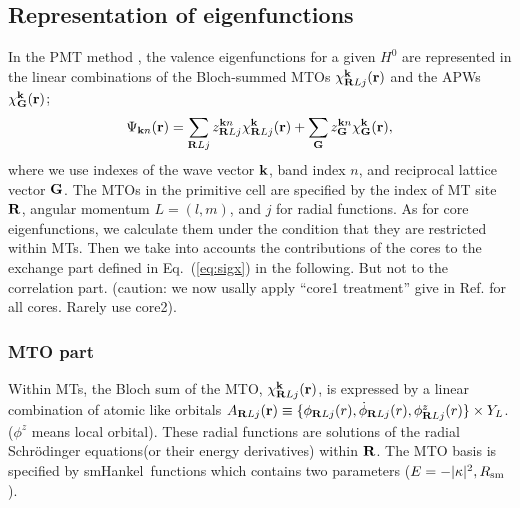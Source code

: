 \documentclass[a4paper,10pt,fleqn]{article}
\def\Psikn{\Psi_{{\bf k}n}}
\def\Psikn{{\Psi_{{\bf k}n}}}
\def\brl{{\bf R}L}
\def\smh{smHankel}
\def\H0{H^0}
\newcommand{\bfk}{{\bf k}}
\newcommand{\bfr}{{\bf r}}
\newcommand{\bfG}{{\bf G}}
\newcommand{\bfR}{{\bf R}}
\newcommand{\req}[1]{\mbox{Eq.~(\ref{#1})}}
\begin{document}
\subsection{Representation of eigenfunctions}
In the PMT method \cite{kotani_fusion_2010}, 
the valence eigenfunctions for a given $\H0$ are represented
in the linear combinations of the Bloch-summed MTOs
$\chi^{\bfk}_{\brl{j}}({\bf r})$ and the APWs $\chi^{\bfk}_\bfG (\bfr)$;
\begin{eqnarray}
\label{eq:lmtopsi}
\Psikn(\bfr) = \sum_{\brl{j}} z^{{\bfk}n}_{\brl{j}}
\chi^{\bfk}_{\brl{j}}({\bfr})+ \sum_{\bfG} z^{\bfk n}_{\bfG}
\chi^{\bfk}_\bfG(\bfr),
\label{eqeigen}
\end{eqnarray}
where we use indexes of the wave vector $\bfk$, band index $n$, and 
reciprocal lattice vector $\bfG$. The MTOs in the primitive cell are 
specified by the index of MT site $\bfR$, 
angular momentum $L=(l,m)$, and $j$ for radial functions. 
As for core eigenfunctions, we calculate them under the condition
that they are restricted within MTs.
Then we take into accounts the contributions of the cores to the exchange part defined in \req{eq:sigx} in the following. But not to the correlation part. 
{\small (caution: we now usally apply ``core1 treatment'' give in 
Ref.\cite{kotani07a} for all cores. Rarely use core2).}


\subsubsection{ MTO part}
Within MTs, the Bloch sum of the MTO, 
$\chi^{{\bf k}}_{\brl{j}}({\bf r})$, is 
expressed by a linear combination of atomic like orbitals 
$A_{\bfR{Lj}}({\bf r})
\equiv \{ 
\phi_{\bfR{Lj}}(r),\dot{\phi}_{\bfR{Lj}}(r),\phi^z_{\bfR{Lj}}(r) \}
\times Y_L$. ($\phi^z$ means local orbital).
These radial functions are solutions of
the radial Schr\"odinger equations(or their energy derivatives)
within $\bfR$. %
The MTO basis is specified by \smh\ functions which
contains two parameters ($E=-|\kappa|^2,R_{\rm sm}$).
\end{document}
